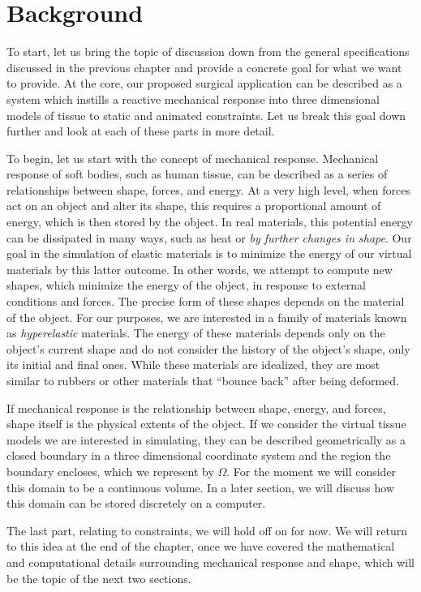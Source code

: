 \section{Background}

To start, let us bring the topic of discussion down from the general
specifications discussed in the previous chapter and provide a
concrete goal for what we want to provide. At the core, our proposed
surgical application can be described as a system which instills a
reactive mechanical response into three dimensional models of tissue
to static and animated constraints. Let us break this goal down
further and look at each of these parts in more detail.

To begin, let us start with the concept of mechanical
response. Mechanical response of soft bodies, such as human tissue,
can be described as a series of relationships between shape, forces,
and energy. At a very high level, when forces act on an object and
alter its shape, this requires a proportional amount of energy, which
is then stored by the object. In real materials, this potential energy can be
dissipated in many ways, such as heat or \textit{by further changes in
shape}. Our goal in the simulation of elastic materials is to minimize
the energy of our virtual materials by this latter outcome. In other
words, we attempt to compute new shapes, which minimize the energy of
the object, in response to external conditions and forces. The precise
form of these shapes depends on the material of the object. For our
purposes, we are interested in a family of materials known as
\textit{hyperelastic} materials. The energy of these materials depends
only on the object's current shape and do not consider the history of
the object's shape, only its initial and final ones. While these
materials are idealized, they are most similar to rubbers or other
materials that ``bounce back'' after being deformed.

If mechanical response is the relationship between shape, energy, and
forces, shape itself is the physical extents of the object. If we
consider the virtual tissue models we are interested in simulating,
they can be described geometrically as a closed boundary in a three
dimensional coordinate system and the region the boundary encloses,
which we represent by $\Omega$. For the moment we will consider this
domain to be a continuous volume. In a later section, we will discuss
how this domain can be stored discretely on a computer.

The last part, relating to constraints, we will hold off on for now. We
will return to this idea at the end of the chapter, once we have
covered the mathematical and computational details surrounding
mechanical response and shape, which will be the topic of the next two
sections.


